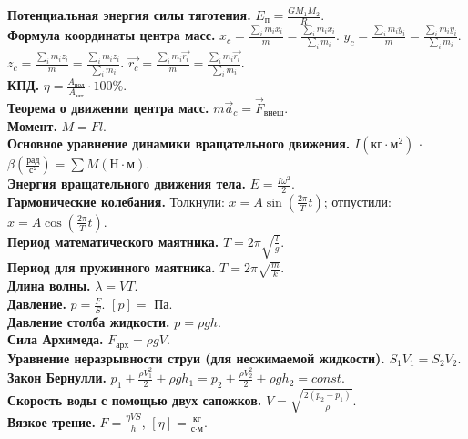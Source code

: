 \documentclass[12pt]{article}
\begin{document}
	\textbf{Потенциальная энергия силы тяготения.}
	$E_{\text{п}} = \frac{GM_1M_2}{R}$. \\
	\textbf{Формула координаты центра масс.} $x_c = \frac{\sum\limits_i m_i x_i}{m} = \frac{\sum\limits_i m_i x_i}{\sum\limits_i m_i}$. $y_c = \frac{\sum\limits_i m_i y_i}{m} = \frac{\sum\limits_i m_i y_i}{\sum\limits_i m_i}$. $z_c = \frac{\sum\limits_i m_i z_i}{m} = \frac{\sum\limits_i m_i z_i}{\sum\limits_i m_i}$. $\vec{r_c} = \frac{\sum\limits_i m_i \vec{r_i}}{m} = \frac{\sum\limits_i m_i \vec{r_i}}{\sum\limits_i m_i}$. \\
	\textbf{КПД.} $\eta = \frac{A_{\text{пол}}}{A_{\text{зат}}} \cdot 100\%$. \\
	\textbf{Теорема о движении центра масс.} $m \vec{a}_c = \vec{F}_{\text{внеш}}$. \\
	\textbf{Момент.} $M = Fl$. \\
	\textbf{Основное уравнение динамики вращательного движения.} $I (\text{кг} \cdot \text{м}^2)$ $\cdot$ $\beta (\frac{\text{рад}}{\text{с}^2}) = \sum M (\text{Н} \cdot \text{м})$. \\
	\textbf{Энергия вращательного движения тела.} $E = \frac{I\omega^2}{2}$. \\
	\textbf{Гармонические колебания.} Толкнули: $x = A \sin (\frac{2\pi}{T} t)$; отпустили: $x = A \cos (\frac{2\pi}{T} t)$. \\
	\textbf{Период математического маятника.} $T = 2\pi\sqrt{\frac{l}{g}}$. \\
	\textbf{Период для пружинного маятника.} $T = 2\pi\sqrt{\frac{m}{k}}$. \\
	\textbf{Длина волны.} $\lambda = VT$. \\
	\textbf{Давление.} $p = \frac{F}{S}$. $[p] =$ Па. \\
	\textbf{Давление столба жидкости.} $p = \rho g h$. \\
	\textbf{Сила Архимеда.} $F_{\text{арх}} = \rho g V$. \\
	\textbf{Уравнение неразрывности струи (для несжимаемой жидкости).} $S_1V_1 = S_2V_2$. \\
	\textbf{Закон Бернулли.} $p_1 + \frac{\rho V_1^2}{2} + \rho g h_1 = p_2 + \frac{\rho V_2^2}{2} + \rho g h_2 = const$. \\
	\textbf{Скорость воды с помощью двух сапожков.} $V = \sqrt{\frac{2(p_2 - p_1)}{\rho}}$. \\
	\textbf{Вязкое трение.}	$F = \frac{\eta V S}{h}$, $[\eta] = \frac{\text{кг}}{\text{с} \cdot \text{м}}$.
\end{document}
